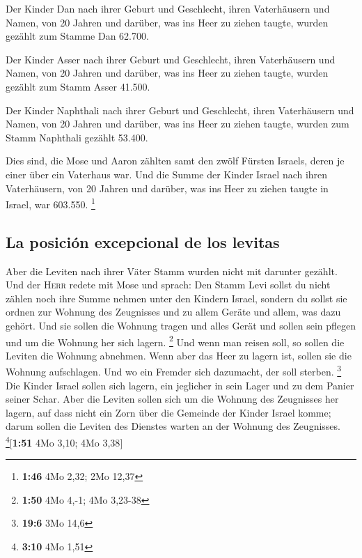  Der Kinder Dan nach ihrer Geburt und Geschlecht, ihren
Vaterhäusern und Namen, von 20 Jahren und darüber, was ins Heer zu
ziehen taugte,  wurden gezählt zum Stamme Dan 62.700.

 Der Kinder Asser nach ihrer Geburt und Geschlecht, ihren
Vaterhäusern und Namen, von 20 Jahren und darüber, was ins Heer zu
ziehen taugte,  wurden gezählt zum Stamm Asser 41.500.

 Der Kinder Naphthali nach ihrer Geburt und Geschlecht,
ihren Vaterhäusern und Namen, von 20 Jahren und darüber, was ins Heer zu
ziehen taugte,  wurden zum Stamm Naphthali gezählt
53.400.

 Dies sind, die Mose und Aaron zählten samt den zwölf
Fürsten Israels, deren je einer über ein Vaterhaus war. 
Und die Summe der Kinder Israel nach ihren Vaterhäusern, von 20 Jahren
und darüber, was ins Heer zu ziehen taugte in Israel, 
war 603.550. \footnote{\textbf{1:46} 4Mo 2,32; 2Mo 12,37}

\hypertarget{la-posiciuxf3n-excepcional-de-los-levitas}{%
\subsection{La posición excepcional de los
levitas}\label{la-posiciuxf3n-excepcional-de-los-levitas}}

 Aber die Leviten nach ihrer Väter Stamm wurden nicht mit
darunter gezählt.  Und der \textsc{Herr} redete mit Mose
und sprach:  Den Stamm Levi sollst du nicht zählen noch
ihre Summe nehmen unter den Kindern Israel,  sondern du
sollst sie ordnen zur Wohnung des Zeugnisses und zu allem Geräte und
allem, was dazu gehört. Und sie sollen die Wohnung tragen und alles
Gerät und sollen sein pflegen und um die Wohnung her sich lagern.
\footnote{\textbf{1:50} 4Mo 4,-1; 4Mo 3,23-38}  Und wenn
man reisen soll, so sollen die Leviten die Wohnung abnehmen. Wenn aber
das Heer zu lagern ist, sollen sie die Wohnung aufschlagen. Und wo ein
Fremder sich dazumacht, der soll sterben. \footnote{\textbf{19:6} 3Mo
  14,6}  Die Kinder Israel sollen sich lagern, ein
jeglicher in sein Lager und zu dem Panier seiner Schar. 
Aber die Leviten sollen sich um die Wohnung des Zeugnisses her lagern,
auf dass nicht ein Zorn über die Gemeinde der Kinder Israel komme; darum
sollen die Leviten des Dienstes warten an der Wohnung des Zeugnisses.
\footnote{\textbf{3:10} 4Mo 1,51}{[}\textbf{1:51} 4Mo 3,10; 4Mo 3,38{]}

